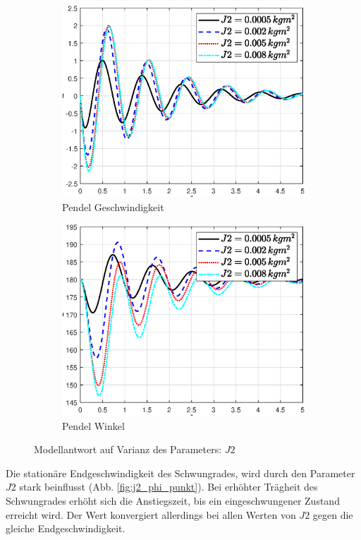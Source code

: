 \begin{figure}
    \begin{subfigure}[b]{0.49\linewidth}
        \includegraphics[width=\linewidth]{plot_data/parameter/fig/j2/theta_punkt.eps}
        \caption{Pendel Geschwindigkeit}
        \label{fig:j2_theta_punkt}      
    \end{subfigure}
    \begin{subfigure}[b]{0.49\linewidth}
        \includegraphics[width=\linewidth]{plot_data/parameter/fig/j2/theta.eps}
        \caption{Pendel Winkel}
        \label{fig:j2_theta}
    \end{subfigure}
        \caption{Modellantwort auf Varianz des Parameters: $J2$}
        \label{fig:j2}
\end{figure}
Die stationäre Endgeschwindigkeit des Schwungrades, wird durch den Parameter $J2$ stark beinflusst (Abb. \ref{fig:j2_phi_punkt}). 
Bei erhöhter Trägheit des Schwungrades erhöht sich die Anstiegszeit, bis ein eingeschwungener Zustand erreicht wird.
Der Wert konvergiert allerdings bei allen Werten von $J2$ gegen die gleiche Endgeschwindigkeit.\\

